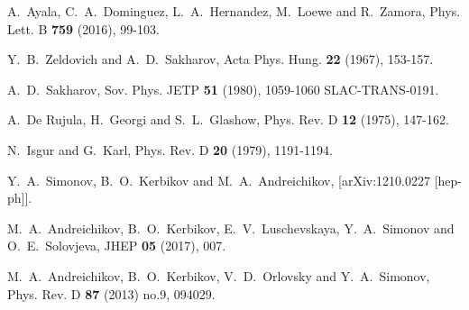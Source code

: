 \begin{thebibliography}{1000}
A.~Ayala, C.~A.~Dominguez, L.~A.~Hernandez, M.~Loewe and R.~Zamora,
Phys. Lett. B \textbf{759} (2016), 99-103.




Y.~B.~Zeldovich and A.~D.~Sakharov,
Acta Phys. Hung. \textbf{22} (1967), 153-157.

A.~D.~Sakharov,
Sov. Phys. JETP \textbf{51} (1980), 1059-1060
SLAC-TRANS-0191.

A.~De Rujula, H.~Georgi and S.~L.~Glashow,
Phys. Rev. D \textbf{12} (1975), 147-162.

N.~Isgur and G.~Karl,
Phys. Rev. D \textbf{20} (1979), 1191-1194.



Y.~A.~Simonov, B.~O.~Kerbikov and M.~A.~Andreichikov,
[arXiv:1210.0227 [hep-ph]].

M.~A.~Andreichikov, B.~O.~Kerbikov, E.~V.~Luschevskaya, Y.~A.~Simonov and O.~E.~Solovjeva,
JHEP \textbf{05} (2017), 007.

M.~A.~Andreichikov, B.~O.~Kerbikov, V.~D.~Orlovsky and Y.~A.~Simonov,
Phys. Rev. D \textbf{87} (2013) no.9, 094029.


\end{thebibliography}

